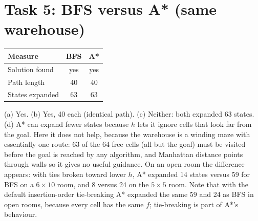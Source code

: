 \documentclass[10pt,a4paper]{article}
\begin{document}
\section*{Task 5: BFS versus A* (same warehouse)}
\begin{center}\begin{tabular}{lcc}\toprule Measure & BFS & A*\\\midrule Solution found & yes & yes\\ Path length & 40 & 40\\ States expanded & 63 & 63\\\bottomrule\end{tabular}\end{center}
(a) Yes. (b) Yes, 40 each (identical path). (c) Neither: both expanded 63 states. (d) A* can expand fewer states because $h$ lets it ignore cells that look far from the goal. Here it does not help, because the warehouse is a winding maze with essentially one route: 63 of the 64 free cells (all but the goal) must be visited before the goal is reached by any algorithm, and Manhattan distance points through walls so it gives no useful guidance. On an open room the difference appears: with ties broken toward lower $h$, A* expanded 14 states versus 59 for BFS on a $6\times10$ room, and 8 versus 24 on the $5\times5$ room. Note that with the default insertion-order tie-breaking A* expanded the same 59 and 24 as BFS in open rooms, because every cell has the same $f$; tie-breaking is part of A*'s behaviour.
\end{document}
